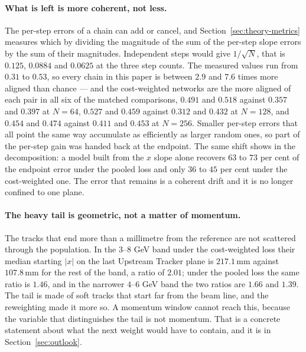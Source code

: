 \documentclass[11pt,a4paper]{article}
\newcommand{\mm}{\ensuremath{\,\mathrm{mm}}}
\begin{document}
\paragraph{What is left is more coherent, not less.} The per-step errors of a
chain can add or cancel, and Section~\ref{sec:theory-metrics} measures which by
dividing the magnitude of the sum of the per-step slope errors by the sum of
their magnitudes. Independent steps would give $1/\sqrt{N}$, that is $0.125$,
$0.0884$ and $0.0625$ at the three step counts. The measured values run from
$0.31$ to $0.53$, so every chain in this paper is between $2.9$ and $7.6$ times
more aligned than chance --- and the cost-weighted networks are the more
aligned of each pair in all six of the matched comparisons, $0.491$ and $0.518$
against $0.357$ and $0.397$ at $N = 64$, $0.527$ and $0.459$ against $0.312$
and $0.432$ at $N = 128$, and $0.454$ and $0.474$ against $0.411$ and $0.453$
at $N = 256$. Smaller per-step errors that all point the same way accumulate as
efficiently as larger random ones, so part of the per-step gain was handed
back at the endpoint. The same shift shows in the decomposition: a model built
from the $x$ slope alone recovers $63$ to $73$ per cent of the endpoint error
under the pooled loss and only $36$ to $45$ per cent under the cost-weighted
one. The error that remains is a coherent drift and it is no longer confined to
one plane.

\paragraph{The heavy tail is geometric, not a matter of momentum.} The tracks
that end more than a millimetre from the reference are not scattered through
the population. In the $3$--$8$ GeV band under the cost-weighted loss their
median starting $|x|$ on the last Upstream Tracker plane is $217.1\mm$ against
$107.8\mm$ for the rest of the band, a ratio of $2.01$; under the pooled loss
the same ratio is $1.46$, and in the narrower $4$--$6$ GeV band the two ratios
are $1.66$ and $1.39$. The tail is made of soft tracks that start far from the
beam line, and the reweighting made it more so. A momentum window cannot reach
this, because the variable that distinguishes the tail is not momentum. That is
a concrete statement about what the next weight would have to contain, and it
is in Section~\ref{sec:outlook}.
\end{document}

